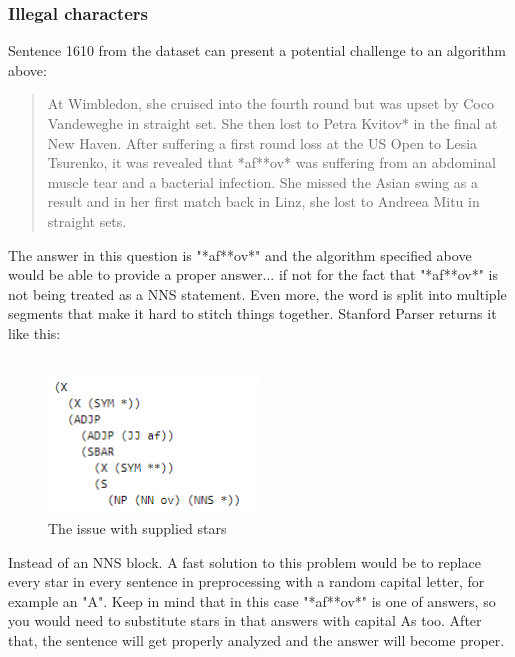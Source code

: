 \documentclass{article}
\begin{document}
\subsubsection{Illegal characters}
Sentence 1610 from the dataset can present a potential challenge to an algorithm above:
\begin{quote}
    At Wimbledon, she cruised into the fourth round but was upset by Coco Vandeweghe in straight set. She then lost to Petra Kvitov* in the final at New Haven. After suffering a first round loss at the US Open to Lesia Tsurenko, it was revealed that *af**ov* was suffering from an abdominal muscle tear and a bacterial infection. She missed the Asian swing as a result and in her first match back in Linz, she lost to Andreea Mitu in straight sets.	
\end{quote}
The answer in this question is "*af**ov*" and the algorithm specified above would be able to provide a proper answer... if not for the fact that "*af**ov*" is not being treated as a NNS statement. Even more, the word is split into multiple segments that make it hard to stitch things together. Stanford Parser returns it like this: \\ \\
\begin{figure}[H]
    \centering
\includegraphics[width=0.5\textwidth]{Example3.png}
    \caption{The issue with supplied stars}
\end{figure}
\noindent Instead of an NNS block. A fast solution to this problem would be to replace every star in every sentence in preprocessing with a random capital letter, for example an "A". Keep in mind that in this case "*af**ov*" is one of answers, so you would need to substitute stars in that answers with capital As too. After that, the sentence will get properly analyzed and the answer will become proper.
\newpage
\end{document}
